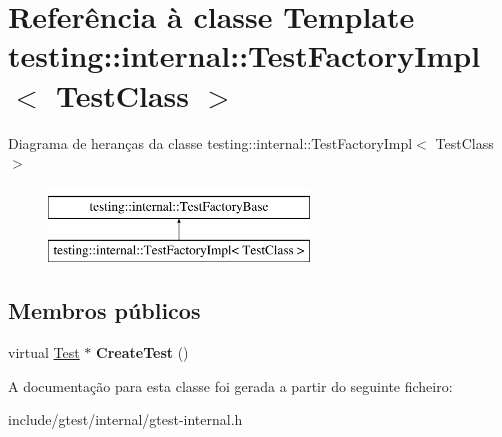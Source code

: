 \hypertarget{classtesting_1_1internal_1_1TestFactoryImpl}{\section{Referência à classe Template testing\-:\-:internal\-:\-:Test\-Factory\-Impl$<$ Test\-Class $>$}
\label{classtesting_1_1internal_1_1TestFactoryImpl}
}
Diagrama de heranças da classe testing\-:\-:internal\-:\-:Test\-Factory\-Impl$<$ Test\-Class $>$\begin{figure}[H]
\begin{center}
\leavevmode
\includegraphics[height=2.000000cm]{classtesting_1_1internal_1_1TestFactoryImpl}
\end{center}
\end{figure}
\subsection*{Membros públicos}
\begin{DoxyCompactItemize}
\item 
\hypertarget{classtesting_1_1internal_1_1TestFactoryImpl_a8860c89bdb06450a5d5e8137ebd9d775}{virtual \hyperlink{classtesting_1_1Test}{Test} $\ast$ {\bfseries Create\-Test} ()}\label{classtesting_1_1internal_1_1TestFactoryImpl_a8860c89bdb06450a5d5e8137ebd9d775}

\end{DoxyCompactItemize}


A documentação para esta classe foi gerada a partir do seguinte ficheiro\-:\begin{DoxyCompactItemize}
\item 
include/gtest/internal/gtest-\/internal.\-h\end{DoxyCompactItemize}
